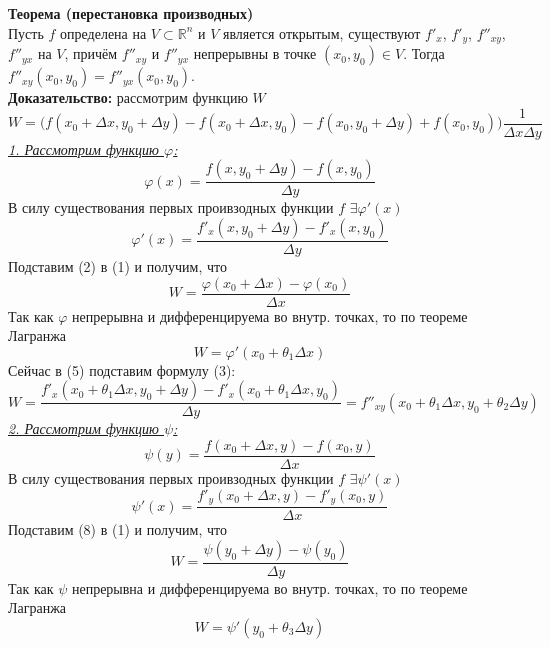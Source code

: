 \documentclass[book, 11pt]{report}
\begin{document}
        \par{\textbf{Теорема (перестановка производных)}\\
        Пусть $f$ определена на $V\subset\mathbb{R}^n$ и $V$ является открытым, существуют $f'_x$, $f'_y$, $f''_{xy}$, $f''_{yx}$ на $V$, причём $f''_{xy}$ и $f''_{yx}$ непрерывны в точке $(x_0,y_0)\in V$. Тогда $f''_{xy}(x_0,y_0)=f''_{yx}(x_0,y_0)$. \\
        \textbf{Доказательство: } рассмотрим функцию $W$
        \begin{equation}
            W=\bigg(f(x_0+\Delta x,y_0+\Delta y)-f(x_0+\Delta x,y_0)-f(x_0,y_0+\Delta y)+f(x_0,y_0)\bigg)\frac{1}{\Delta x\Delta y}
        \end{equation}
        \underline{\textit{1. Рассмотрим функцию $\varphi$:}}
        \begin{equation}
            \varphi(x)=\frac{f(x,y_0+\Delta y)-f(x,y_0)}{\Delta y}
        \end{equation}
        В силу существования первых проивзодных функции $f$ $\exists\varphi'(x)$
        \begin{equation}
            \varphi'(x)=\frac{f'_x(x,y_0+\Delta y)-f'_x(x,y_0)}{\Delta y}
        \end{equation}
        Подставим (2) в (1) и получим, что
        \begin{equation}
            W=\frac{\varphi(x_0+\Delta x)-\varphi(x_0)}{\Delta x}
        \end{equation}
        Так как $\varphi$ непрерывна и дифференцируема во внутр. точках, то по теореме Лагранжа
        \begin{equation}
            W=\varphi'(x_0+\theta_1\Delta x)
        \end{equation}
        Сейчас в (5) подставим формулу (3):
        \begin{equation}
            W=\frac{f'_x(x_0+\theta_1\Delta x,y_0+\Delta y)-f'_x(x_0+\theta_1\Delta x,y_0)}{\Delta y}=f''_{xy}(x_0+\theta_1\Delta x,y_0+\theta_2\Delta y)
        \end{equation}
        \underline{\textit{2. Рассмотрим функцию $\psi$:}}
        \begin{equation}
            \psi(y)=\frac{f(x_0+\Delta x, y)-f(x_0,y)}{\Delta x}
        \end{equation}
        В силу существования первых проивзодных функции $f$ $\exists\psi'(x)$
        \begin{equation}
            \psi'(x)=\frac{f'_y(x_0+\Delta x, y)-f'_y(x_0,y)}{\Delta x}
        \end{equation}
        Подставим (8) в (1) и получим, что
        \begin{equation}
            W=\frac{\psi(y_0+\Delta y)-\psi(y_0)}{\Delta y}
        \end{equation}
        Так как $\psi$ непрерывна и дифференцируема во внутр. точках, то по теореме Лагранжа
        \begin{equation}
            W=\psi'(y_0+\theta_3\Delta y)
        \end{equation}
        }
\end{document}
